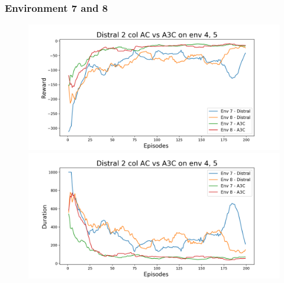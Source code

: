 \documentclass[12pt]{report}
\begin{document}
\subsubsection{Environment 7 and 8}
\begin{figure}[H]
\centering
\begin{minipage}{.5\textwidth}
\centering
\includegraphics[width=\textwidth]{figs/d2_col_ac/d2_col_ac_7_8_rwd.png}
\end{minipage}%
\centering
\begin{minipage}{.5\textwidth}
\centering
\includegraphics[width=\textwidth]{figs/d2_col_ac/d2_col_ac_7_8_dur.png}
\end{minipage}%
\end{figure}
\end{document}
